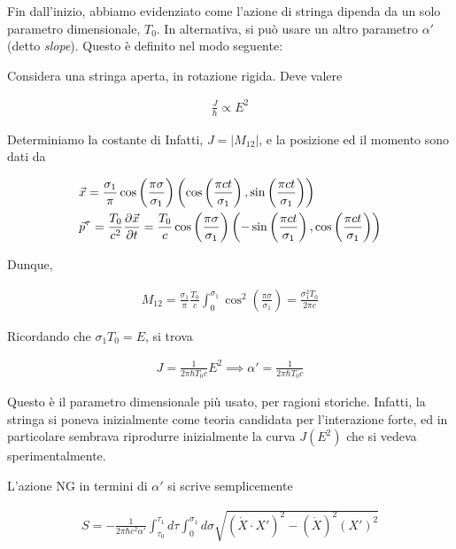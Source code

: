 \documentclass{report}
\begin{document}
Fin dall'inizio, abbiamo evidenziato come l'azione di stringa dipenda da un solo parametro dimensionale, \(T_0\). In alternativa, si può usare un altro parametro \(\alpha'\) (detto \emph{slope}). Questo è definito nel modo seguente: 

Considera una stringa aperta, in rotazione rigida. Deve valere 

\begin{align}
    \frac{J}{\hbar} \propto E^2 
\end{align}

Determiniamo la costante di Infatti, \(J = |M_{12}|\), e la posizione ed il momento sono dati da 

\begin{align}
    &\vec{x} = \frac{\sigma_1}{\pi}\cos\left(\frac{\pi\sigma}{\sigma_1} \right)\left(\cos\left(\frac{\pi ct}{\sigma_1} \right), \sin\left(\frac{\pi ct}{\sigma_1}  \right) \right) \notag \\
    &\vec{p}^\tau = \frac{T_0}{c^2}\frac{\partial \vec{x}}{\partial t} = \frac{T_0}{c}\cos\left(\frac{\pi\sigma}{\sigma_1} \right)\left(-\sin\left(\frac{\pi ct}{\sigma_1} \right), \cos\left(\frac{\pi ct}{\sigma_1}  \right) \right)
\end{align}

Dunque, 

\begin{align}
    M_{12} = \frac{\sigma_1}{\pi}\frac{T_0}{c}\int_0^{\sigma_1}\cos^2\left(\frac{\pi \sigma}{\sigma_1} \right) = \frac{\sigma_1^2 T_0}{2\pi c} 
\end{align}

Ricordando che \(\sigma_1 T_0 = E\), si trova 

\begin{align}
    J = \frac{1}{2\pi \hbar T_0 c}E^2 \implies \alpha' = \frac{1}{2\pi \hbar T_0 c}
\end{align}

Questo è il parametro dimensionale più usato, per ragioni storiche. Infatti, la stringa si poneva inizialmente come teoria candidata per l'interazione forte, ed in particolare sembrava riprodurre inizialmente la curva \(J(E^2)\) che si vedeva sperimentalmente. 

L'azione NG in termini di \(\alpha'\) si scrive semplicemente 

\begin{align}
    S = -\frac{1}{2\pi \hbar c^2 \alpha'}\int_{\tau_0}^{\tau_1}d\tau \int_0^{\sigma_1}d\sigma \sqrt{(\dot{X}\cdot X')^2 - (\dot{X})^2(X')^2}
\end{align}
\end{document}
